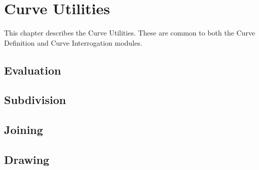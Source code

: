 \chapter{Curve Utilities}
\label{curveutilities}
This chapter describes the Curve Utilities.
These are common to both the Curve Definition and Curve Interrogation modules.


\pgsbreak
\section{Evaluation}

\pgsbreak

\pgsbreak

\pgsbreak

\pgsbreak


\section {Subdivision}

\pgsbreak

\pgsbreak

\pgsbreak

\pgsbreak

\pgsbreak

\pgsbreak
\section{Joining}

\pgsbreak

\pgsbreak

\pgsbreak

\pgsbreak
\section{Drawing}

\pgsbreak

\pgsbreak

